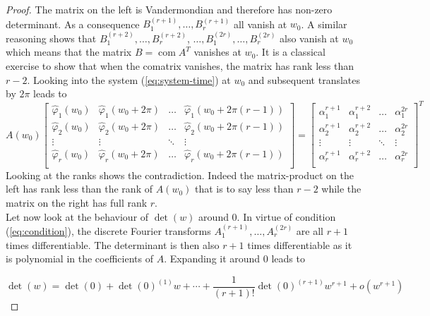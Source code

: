 \documentclass[a4paper, 11pt]{article}
\DeclareMathOperator*{\com}{com}
\begin{document}
\begin{proof}
  The matrix on the left is Vandermondian and therefore has non-zero determinant. As a consequence $B_1^{(r+1)}, \ldots, 
  B_r^{(r+1)}$ all vanish at $w_0$. A similar reasoning shows that $B_1^{(r+2)}, \ldots, B_r^{(r+2)}$, $\ldots, 
  B_1^{(2r)}, \ldots, B_r^{(2r)}$ also vanish at $w_0$ which means that the matrix $B = {\com A}^T$ vanishes at $w_0$.  
  It is a classical exercise to show that when the comatrix vanishes, the matrix has rank less than $r-2$. Looking into 
  the system (\ref{eq:system-time}) at $w_0$ and subsequent translates by $2\pi$ leads to \begin{equation}
    A(w_0) \begin{bmatrix}
      \hat{\varphi}_1(w_0) & \hat{\varphi}_1(w_0+2\pi) & \hdots & \hat{\varphi}_1(w_0 + 2\pi(r-1)) \\
      \hat{\varphi}_2(w_0) & \hat{\varphi}_2(w_0+2\pi) & \hdots & \hat{\varphi}_2(w_0 + 2\pi(r-1)) \\
      \vdots & \vdots & \ddots & \vdots \\
      \hat{\varphi}_r(w_0) & \hat{\varphi}_r(w_0+2\pi) & \hdots & \hat{\varphi}_r(w_0 + 2\pi(r-1)) \\
    \end{bmatrix}
    =
    \begin{bmatrix}
      \alpha_1^{r+1} & \alpha_1^{r+2} & \hdots & \alpha_1^{2r} \\
      \alpha_2^{r+1} & \alpha_2^{r+2} & \hdots & \alpha_2^{2r} \\
      \vdots & \vdots & \ddots & \vdots \\
      \alpha_r^{r+1} & \alpha_r^{r+2} & \hdots & \alpha_r^{2r} \\
    \end{bmatrix}^T
  \end{equation}
  Looking at the ranks shows the contradiction. Indeed the matrix-product on the left has rank less than the rank of  
  $A(w_0)$ that is to say less than $r-2$ while the matrix on the right has full rank $r$. \\

  Let now look at the behaviour of $\det(w)$ around 0. In virtue of condition (\ref{eq:condition}), the discrete Fourier 
  transforms $A_1^{(r+1)}, \ldots, A_r^{(2r)}$ are all $r+1$ times differentiable. The determinant is then also $r+1$ 
  times differentiable as it is polynomial in the coefficients of $A$. Expanding it around 0 leads to 

  \begin{equation}\label{eq:taylor-det}
    \det(w) = \det(0) + {\det(0)}^{(1)}w + \cdots + \frac{1}{(r+1)!} {\det(0)}^{(r+1)}w^{r+1} + o(w^{r+1})
  \end{equation}


\end{proof}
\end{document}

